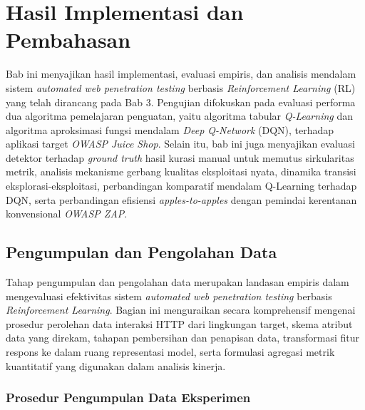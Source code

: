 \chapter{Hasil Implementasi dan Pembahasan}

Bab ini menyajikan hasil implementasi, evaluasi empiris, dan analisis mendalam sistem \textit{automated web penetration testing} berbasis \textit{Reinforcement Learning} (RL) yang telah dirancang pada Bab 3. Pengujian difokuskan pada evaluasi performa dua algoritma pemelajaran penguatan, yaitu algoritma tabular \textit{Q-Learning} dan algoritma aproksimasi fungsi mendalam \textit{Deep Q-Network} (DQN), terhadap aplikasi target \textit{OWASP Juice Shop}. Selain itu, bab ini juga menyajikan evaluasi detektor terhadap \textit{ground truth} hasil kurasi manual untuk memutus sirkularitas metrik, analisis mekanisme gerbang kualitas eksploitasi nyata, dinamika transisi eksplorasi-eksploitasi, perbandingan komparatif mendalam Q-Learning terhadap DQN, serta perbandingan efisiensi \textit{apples-to-apples} dengan pemindai kerentanan konvensional \textit{OWASP ZAP}.

\section{Pengumpulan dan Pengolahan Data}

Tahap pengumpulan dan pengolahan data merupakan landasan empiris dalam mengevaluasi efektivitas sistem \textit{automated web penetration testing} berbasis \textit{Reinforcement Learning}. Bagian ini menguraikan secara komprehensif mengenai prosedur perolehan data interaksi HTTP dari lingkungan target, skema atribut data yang direkam, tahapan pembersihan dan penapisan data, transformasi fitur respons ke dalam ruang representasi model, serta formulasi agregasi metrik kuantitatif yang digunakan dalam analisis kinerja.

\subsection{Prosedur Pengumpulan Data Eksperimen}

